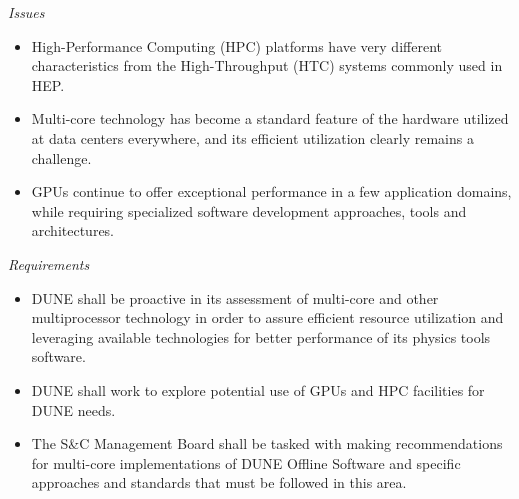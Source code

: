 \noindent \textit{Issues}
\begin{itemize}
	\item High-Performance Computing (HPC) platforms have very different characteristics from the High-Throughput (HTC) systems commonly used in HEP.
	
	\item Multi-core technology has become a standard feature of the hardware utilized at data centers everywhere, and its efficient utilization clearly remains a challenge.
	
	\item GPUs continue to offer exceptional performance in a few application domains, while requiring specialized software development approaches, tools and architectures.
	
\end{itemize}
\noindent
\textit{Requirements}
\begin{itemize}
	\item DUNE shall be proactive in its assessment of multi-core and other multiprocessor technology in order to assure efficient
	resource utilization and leveraging available technologies for better performance of its physics tools software.
	
	\item DUNE shall work to explore potential use of GPUs and HPC facilities for DUNE needs.
	
	\item The S\&C Management Board shall be tasked with making recommendations for multi-core implementations of DUNE Offline Software
	and specific approaches and standards that must be followed in this area.
	
\end{itemize}

